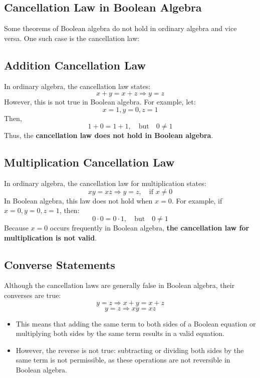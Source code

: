 \subsection{Cancellation Law in Boolean Algebra}

Some theorems of Boolean algebra do not hold in ordinary algebra and vice versa. One such case is the \color{blue} cancellation law: \color{black}

\subsection{Addition Cancellation Law}
In ordinary algebra, the cancellation law states:
\[
    x + y = x + z \Rightarrow y = z
\]
However, this is not true in Boolean algebra. For example, let:
\[ x = 1, y = 0, z = 1 \]
Then,
\[
    1 + 0 = 1 + 1, \quad \text{but} \quad 0 \neq 1
\]
Thus, the \textbf{cancellation law does not hold in Boolean algebra}.

\subsection{Multiplication Cancellation Law}
In ordinary algebra, the cancellation law for multiplication states:
\[
    xy = xz \Rightarrow y = z, \quad \text{if } x \neq 0
\]
In Boolean algebra, this law does not hold when \( x = 0 \). For example, if \( x = 0, y = 0, z = 1 \), then:
\[
    0 \cdot 0 = 0 \cdot 1, \quad \text{but} \quad 0 \neq 1
\]
Because \( x = 0 \) occurs frequently in Boolean algebra, \textbf{the cancellation law for multiplication is not valid}.

\subsection{Converse Statements}
Although the cancellation laws are generally false in Boolean algebra, their converses are true:
\[
    y = z \Rightarrow x + y = x + z
\]
\[
    y = z \Rightarrow xy = xz
\]
\begin{itemize}
\item This means that adding the same term to both sides of a Boolean equation or multiplying both sides by the same term results in a valid equation. 
\item However, the reverse is not true: subtracting or dividing both sides by the same term is not permissible, as these operations are not reversible in Boolean algebra.
\end{itemize}
